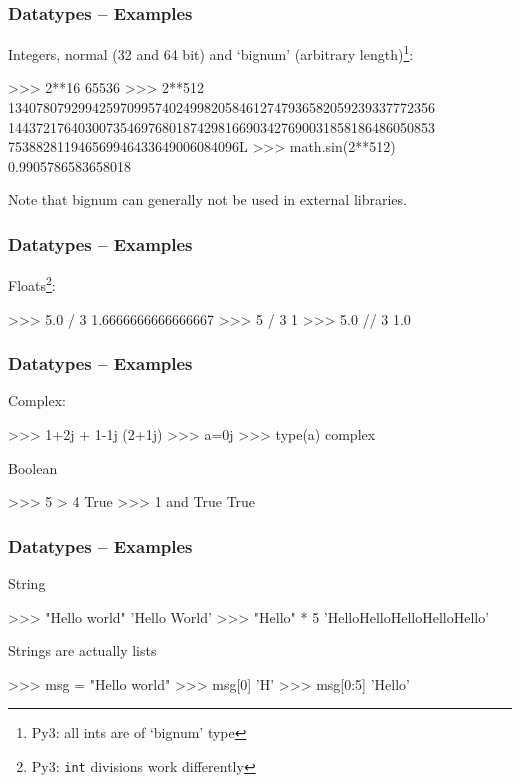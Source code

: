 \documentclass[xetex,10pt]{beamer}
\newcommand{\pypypy}[1]{\footnote[frame]{Py3: #1}}
\def\pythoni{\lstinline[language=pythontim]}
\begin{document}
\begin{frame}[fragile]
	\frametitle{Datatypes -- Examples}

	Integers, normal (32 and 64 bit) and `bignum' (arbitrary length)\pypypy{all ints are of `bignum' type}:

	\vspace*{1em}

\begin{python}
>>> 2**16
65536
>>> 2**512
1340780792994259709957402499820584612747936582059239337772356
1443721764030073546976801874298166903427690031858186486050853
753882811946569946433649006084096L
>>> math.sin(2**512)
0.9905786583658018
\end{python}

	\vspace*{1em}

Note that bignum can generally not be used in external libraries.
\end{frame}


\begin{frame}[fragile]
	\frametitle{Datatypes -- Examples}

Floats\pypypy{\pythoni{int} divisions work differently}:
\begin{python}
>>> 5.0 / 3
1.6666666666666667
>>> 5 / 3
1
>>> 5.0 // 3
1.0
\end{python}
\end{frame}


\begin{frame}[fragile]
	\frametitle{Datatypes -- Examples}

Complex:
\begin{python}
>>> 1+2j + 1-1j
(2+1j)
>>> a=0j
>>> type(a)
complex
\end{python}

	\vspace*{1em}

Boolean
\begin{python}
>>> 5 > 4
True
>>> 1 and True
True
\end{python}

\end{frame}


\begin{frame}[fragile]
	\frametitle{Datatypes -- Examples}

String
\begin{python}
>>> "Hello world"
'Hello World'
>>> "Hello" * 5
'HelloHelloHelloHelloHello'
\end{python}

	\vspace*{1em}

Strings are actually lists
\begin{python}
>>> msg = "Hello world"
>>> msg[0]
'H'
>>> msg[0:5]
'Hello'
\end{python}
\end{frame}
\end{document}
